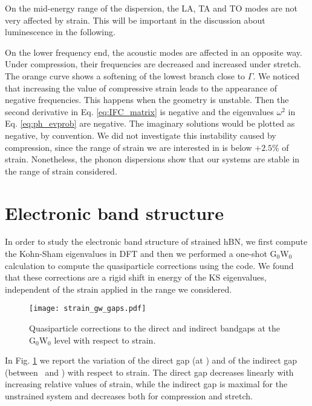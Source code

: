 On the mid-energy range of the dispersion, the LA, TA and TO modes are not very affected by strain. This will be important in the discussion about luminescence in the following.

On the lower frequency end, the acoustic modes are affected in an opposite way. Under compression, their frequencies are decreased and increased under stretch. The orange curve shows a softening of the lowest branch close to $\Gamma$. We noticed that increasing the value of compressive strain leads to the appearance of negative frequencies. This happens when the geometry is unstable. Then the second derivative in Eq. \eqref{eq:IFC_matrix} is negative and the eigenvalues $\omega^2$ in Eq. \eqref{eq:ph_evprob} are negative. The imaginary solutions would be plotted as negative, by convention. We did not investigate this instability caused by compression, since the range of strain we are interested in is below $+2.5\%$ of strain. Nonetheless, the phonon dispersions show that our systems are stable in the range of strain considered.

%
\section{Electronic band structure}
In order to study the electronic band structure of strained hBN, we first compute the Kohn-Sham eigenvalues in \acrshort{DFT} and then we performed a one-shot G$_0$W$_0$ calculation to compute the quasiparticle corrections using the \yambo code.\cite{Sangalli_2019} We found that these corrections are a rigid shift in energy of the KS eigenvalues, independent of the strain applied in the range we considered. 
\begin{figure}[tbp]
	\vspace{0.5cm}
	\setcapindent{2em}
	\centering
	\texttt{[image: strain\_gw\_gaps.pdf]}
	\caption{Quasiparticle corrections to the direct and indirect bandgaps at the G$_0$W$_0$ level with respect to strain.}
	\label{fig:strain_gw_gaps}
\end{figure}
In Fig. \ref{fig:strain_gw_gaps} we report the variation of the direct gap (at \MM) and of the indirect gap (between \KK~and \MM) with respect to strain. The direct gap decreases linearly with increasing relative values of strain, while the indirect gap is maximal for the unstrained system and decreases both for compression and stretch.

